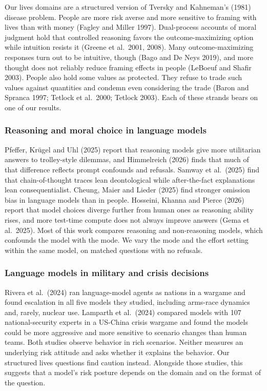 \documentclass[
  11pt,
]{article}
\begin{document}
Our lives domains are a structured version of Tversky and Kahneman's
(1981) disease problem. People are more risk averse and more sensitive
to framing with lives than with money (Fagley and Miller 1997).
Dual-process accounts of moral judgment hold that controlled reasoning
favors the outcome-maximizing option while intuition resists it (Greene
et al.~2001, 2008). Many outcome-maximizing responses turn out to be
intuitive, though (Bago and De Neys 2019), and more thought does not
reliably reduce framing effects in people (LeBoeuf and Shafir 2003).
People also hold some values as protected. They refuse to trade such
values against quantities and condemn even considering the trade (Baron
and Spranca 1997; Tetlock et al.~2000; Tetlock 2003). Each of these
strands bears on one of our results.

\hypertarget{reasoning-and-moral-choice-in-language-models}{%
\subsubsection{Reasoning and moral choice in language
models}\label{reasoning-and-moral-choice-in-language-models}}

Pfeffer, Krügel and Uhl (2025) report that reasoning models give more
utilitarian answers to trolley-style dilemmas, and Himmelreich (2026)
finds that much of that difference reflects prompt confounds and
refusals. Samway et al.~(2025) find that chain-of-thought traces lean
deontological while after-the-fact explanations lean consequentialist.
Cheung, Maier and Lieder (2025) find stronger omission bias in language
models than in people. Hosseini, Khanna and Pierce (2026) report that
model choices diverge further from human ones as reasoning ability
rises, and more test-time compute does not always improve answers (Gema
et al.~2025). Most of this work compares reasoning and non-reasoning
models, which confounds the model with the mode. We vary the mode and
the effort setting within the same model, on matched questions with no
refusals.

\hypertarget{language-models-in-military-and-crisis-decisions}{%
\subsubsection{Language models in military and crisis
decisions}\label{language-models-in-military-and-crisis-decisions}}

Rivera et al.~(2024) ran language-model agents as nations in a wargame
and found escalation in all five models they studied, including
arms-race dynamics and, rarely, nuclear use. Lamparth et al.~(2024)
compared models with 107 national-security experts in a US-China crisis
wargame and found the models could be more aggressive and more sensitive
to scenario changes than human teams. Both studies observe behavior in
rich scenarios. Neither measures an underlying risk attitude and asks
whether it explains the behavior. Our structured lives questions find
caution instead. Alongside those studies, this suggests that a model's
risk posture depends on the domain and on the format of the question.
\end{document}
